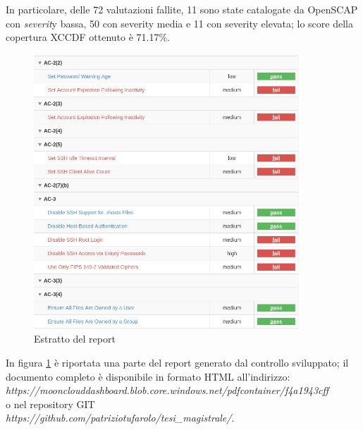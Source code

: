 \documentclass[../main.tex]{subfiles}
\begin{document}
In particolare, delle 72 valutazioni fallite, 11 sono state catalogate da OpenSCAP con \textit{severit}y bassa, 50 con severity media e 11 con severity elevata; lo score della copertura XCCDF ottenuto è 71.17\%.
\begin{figure}[H]
    \centering
    \includegraphics[width=10cm]{immagini/test_oscap_1_1.png}
    \caption{Estratto del report}\label{ref:report_oscap_1_1}
\end{figure}

In figura \ref{ref:report_oscap_1_1} è riportata una parte del report generato dal controllo sviluppato; il documento completo è disponibile in formato HTML all'indirizzo:\\
\textit{https://moonclouddashboard.blob.core.windows.net/pdfcontainer/f4a1943cff}
\\
o nel repository GIT\\
\textit{https://github.com/patriziotufarolo/tesi\_magistrale/}.
\end{document}
